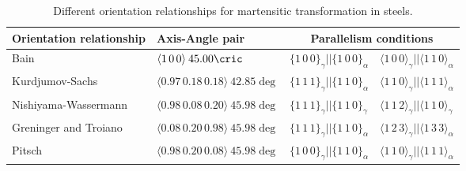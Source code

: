 
\begin{table}[t]
  \begin{tabular}{ l l l l }
  \hline\hline
      Orientation relationship & Axis-Angle pair & \multicolumn{2}{c}{Parallelism conditions} \\
      \hline
      Bain \cite{bain1924nature} &
      $\langle1\,0\,0\rangle\:45.00\cric$ &
      $\{1\,0\,0\}_{\gamma} || \{1\,0\,0\}_{\alpha}$ &
      $\langle1\,0\,0\rangle_{\gamma} || \langle1\,1\,0\rangle_{\alpha}$ \\
      
      Kurdjumov-Sachs \cite{kurdjumow1930mechanismus} &
      $\langle0.97\,0.18\,0.18\rangle\:42.85\deg$ &
      $\{1\,1\,1\}_{\gamma} || \{1\,1\,0\}_{\alpha}$ &
      $\langle1\,1\,0\rangle_{\gamma} || \langle1\,1\,1\rangle_{\alpha}$ \\
      
      Nishiyama-Wassermann \cite{nishiyama1934x,wassermann1935ueber} &
      $\langle0.98\,0.08\,0.20\rangle\:45.98\deg$ &
      $\{1\,1\,1\}_{\gamma} || \{1\,1\,0\}_{\gamma}$ &
      $\langle1\,1\,2\rangle_{\gamma} || \langle1\,1\,0\rangle_{\gamma}$ \\
      
      Greninger and Troiano \cite{greninger1949mechanism} &
      $\langle0.08\,0.20\,0.98\rangle\:45.98\deg$ &
      $\{1\,1\,1\}_{\gamma} || \{1\,1\,0\}_{\alpha}$ &
      $\langle1\,2\,3\rangle_{\gamma} || \langle1\,3\,3\rangle_{\alpha}$ \\
      
      Pitsch \cite{pitsch1962orientierungszusammenhang} &
      $\langle0.98\,0.20\,0.08\rangle\:45.98\deg$ &
      $\{1\,0\,0\}_{\gamma} || \{1\,1\,0\}_{\alpha}$ &
      $\langle1\,1\,0\rangle_{\gamma} || \langle1\,1\,1\rangle_{\alpha}$ \\
  \hline
  \end{tabular}
  \caption{\label{tab:ORs}Different orientation relationships for martensitic transformation in steels.}
  \end{table}
  